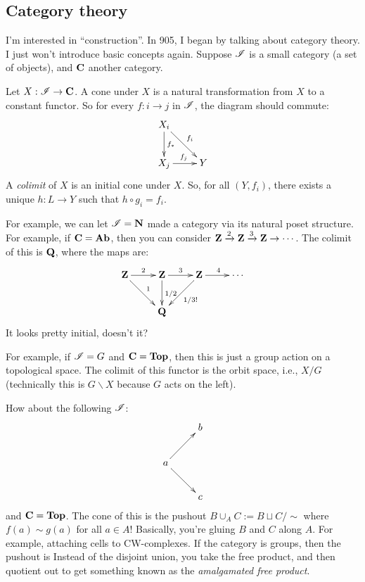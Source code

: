 \subsection{Category theory}
I'm interested in ``construction''. In 905, I began by talking about category theory. I just won't introduce basic concepts again. Suppose $\mathscr I$ is a small category (a set of objects), and $\mathbf C$ another category.
\begin{definition}
    Let $X:\mathscr I\to\mathbf C$. A cone under $X$ is a natural transformation from $X$ to a constant functor. So for every $f:i\to j$ in $\mathscr I$, the diagram should commute:
    \begin{equation*}
	\xymatrix{
	    X_i\ar[d]^{f_\ast}\ar[dr]^{f_i} & \\
	    X_j\ar[r]^{f_j} & Y
	    }
    \end{equation*}
    A \emph{colimit} of $X$ is an initial cone under $X$. So, for all $(Y,f_i)$, there exists a unique $h:L\to Y$ such that $h\circ g_i = f_i$.
\end{definition}
For example, we can let $\mathscr I = \mathbf{N}$ made a category via its natural poset structure. For example, if $\mathbf C = \mathbf{Ab}$, then you can consider $\mathbf Z\xrightarrow{2}\mathbf Z\xrightarrow{3}\mathbf Z\to\cdots$. The colimit of this is $\mathbf Q$, where the maps are:
\begin{equation*}
    \xymatrix{
	\Z\ar[r]^2\ar[dr]^1 & \Z\ar[r]^3\ar[d]^{1/2} & \Z\ar[r]^4\ar[dl]^{1/3!} & \cdots\\
	& \QQ & &
    }
\end{equation*}
It looks pretty initial, doesn't it?

For example, if $\mathscr I = G$ and $\mathbf C=\mathbf{Top}$, then this is just a group action on a topological space. The colimit of this functor is the orbit space, i.e., $X/G$ (technically this is $G\backslash X$ because $G$ acts on the left).

How about the following $\mathscr I$:
\begin{equation*}
    \xymatrix{
	& b\\
	a\ar[ur]\ar[dr] & \\
	& c
    }
\end{equation*}
and $\mathbf C=\mathbf{Top}$. The cone of this is the pushout $B\cup_A C:= B\sqcup C/\sim$ where $f(a)\sim g(a)$ for all $a\in A$! Basically, you're gluing $B$ and $C$ along $A$. For example, attaching cells to CW-complexes. If the category is groups, then the pushout is Instead of the disjoint union, you take the free product, and then quotient out to get something known as the \emph{amalgamated free product}.

